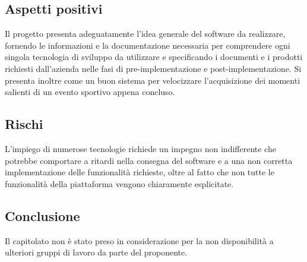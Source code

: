 \documentclass[../studio-di-fattibilita.tex]{subfiles}
\begin{document}
\subsection{Aspetti positivi}%
\label{sub:aspetti_positivi}
Il progetto presenta adeguatamente l'idea generale del software da realizzare, fornendo le informazioni e la documentazione necessaria per
comprendere ogni singola tecnologia di sviluppo da utilizzare e specificando i documenti e i prodotti richiesti dall'azienda nelle fasi di pre-implementazione e post-implementazione.
Si presenta inoltre come un buon sistema per velocizzare l'acquisizione dei momenti salienti di un evento sportivo appena concluso.

\subsection{Rischi}%
\label{sub:rischi}
L’impiego di numerose tecnologie richiede un impegno non indifferente che potrebbe comportare a ritardi nella consegna del software e a una non corretta implementazione delle funzionalità richieste, oltre al fatto che non tutte le funzionalità della piattaforma vengono chiaramente esplicitate.

\subsection{Conclusione}%
\label{sub:conclusione}
Il capitolato non è stato preso in considerazione per la non disponibilità a ulteriori gruppi di lavoro da parte del proponente.
\end{document}
